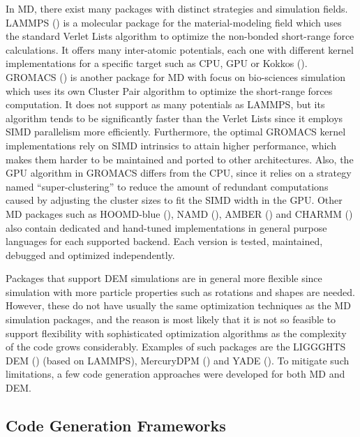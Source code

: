 \documentclass[Afour,sageh,times]{sagej}
\begin{document}
In MD, there exist many packages with distinct strategies and simulation fields.
LAMMPS (\cite{lammps1,lammps2}) is a molecular package for the material-modeling field which uses the standard Verlet Lists algorithm to optimize the non-bonded short-range force calculations.
It offers many inter-atomic potentials, each one with different kernel implementations for a specific target such as CPU, GPU or Kokkos (\cite{kokkos}).
GROMACS (\cite{gromacs1,gromacs2}) is another package for MD with focus on bio-sciences simulation which uses its own Cluster Pair algorithm to optimize the short-range forces computation.
It does not support as many potentials as LAMMPS, but its algorithm tends to be significantly faster than the Verlet Lists since it employs SIMD parallelism more efficiently.
Furthermore, the optimal GROMACS kernel implementations rely on SIMD intrinsics to attain higher performance, which makes them harder to be maintained and ported to other architectures.
Also, the GPU algorithm in GROMACS differs from the CPU, since it relies on a strategy named ``super-clustering'' to reduce the amount of redundant computations caused by adjusting the cluster sizes to fit the SIMD width in the GPU.
Other MD packages such as HOOMD-blue (\cite{hoomdblue}), NAMD (\cite{namd}), AMBER (\cite{amber1}) and CHARMM (\cite{charmm}) also contain dedicated and hand-tuned implementations in general purpose languages for each supported backend.
Each version is tested, maintained, debugged and optimized independently.

Packages that support DEM simulations are in general more flexible since simulation with more particle properties such as rotations and shapes are needed.
However, these do not have usually the same optimization techniques as the MD simulation packages, and the reason is most likely that it is not so feasible to support flexibility with sophisticated optimization algorithms as the complexity of the code grows considerably.
Examples of such packages are the LIGGGHTS DEM (\cite{liggghts}) (based on LAMMPS), MercuryDPM (\cite{mercurydpm}) and YADE (\cite{yade}).
To mitigate such limitations, a few code generation approaches were developed for both MD and DEM.

\subsection{Code Generation Frameworks}
\label{sec:codegen}

\end{document}
